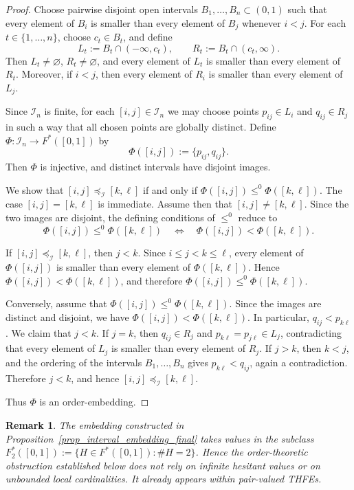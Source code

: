 \documentclass[11pt,a4paper]{article}
\newtheorem{remark}{Remark}
\begin{document}
\begin{proof}
Choose pairwise disjoint open intervals \(B_1,\dots,B_n\subset(0,1)\) such that every element of \(B_i\) is smaller than every element of \(B_j\) whenever \(i<j\). For each \(t\in\{1,\dots,n\}\), choose \(c_t\in B_t\), and define
\[
L_t:=B_t\cap(-\infty,c_t),
\qquad
R_t:=B_t\cap(c_t,\infty).
\]
Then \(L_t\neq\varnothing\), \(R_t\neq\varnothing\), and every element of \(L_t\) is smaller than every element of \(R_t\). Moreover, if \(i<j\), then every element of \(R_i\) is smaller than every element of \(L_j\).

Since \(\mathcal I_n\) is finite, for each \([i,j]\in\mathcal I_n\) we may choose points \(p_{ij}\in L_i\) and \(q_{ij}\in R_j\) in such a way that all chosen points are globally distinct. Define \(\Phi:\mathcal I_n\to F^*([0,1])\) by
\[
\Phi([i,j]):=\{p_{ij},q_{ij}\}.
\]
Then \(\Phi\) is injective, and distinct intervals have disjoint images.

We show that \([i,j]\preceq_{\mathcal I}[k,\ell]\) if and only if \(\Phi([i,j])\leq^0\Phi([k,\ell])\). The case \([i,j]=[k,\ell]\) is immediate. Assume then that \([i,j]\neq[k,\ell]\). Since the two images are disjoint, the defining conditions of \(\leq^0\) reduce to
\[
\Phi([i,j])\leq^0\Phi([k,\ell])
\quad\Longleftrightarrow\quad
\Phi([i,j])<\Phi([k,\ell]).
\]

If \([i,j]\preceq_{\mathcal I}[k,\ell]\), then \(j<k\). Since \(i\le j<k\le \ell\), every element of \(\Phi([i,j])\) is smaller than every element of \(\Phi([k,\ell])\). Hence \(\Phi([i,j])<\Phi([k,\ell])\), and therefore \(\Phi([i,j])\leq^0\Phi([k,\ell])\).

Conversely, assume that \(\Phi([i,j])\leq^0\Phi([k,\ell])\). Since the images are distinct and disjoint, we have \(\Phi([i,j])<\Phi([k,\ell])\). In particular, \(q_{ij}<p_{k\ell}\). We claim that \(j<k\). If \(j=k\), then \(q_{ij}\in R_j\) and \(p_{k\ell}=p_{j\ell}\in L_j\), contradicting that every element of \(L_j\) is smaller than every element of \(R_j\). If \(j>k\), then \(k<j\), and the ordering of the intervals \(B_1,\dots,B_n\) gives \(p_{k\ell}<q_{ij}\), again a contradiction. Therefore \(j<k\), and hence \([i,j]\preceq_{\mathcal I}[k,\ell]\).

Thus \(\Phi\) is an order-embedding.
\end{proof}

\begin{remark}\label{rem:two-point-obstruction}
The embedding constructed in Proposition~\ref{prop_interval_embedding_final} takes values in the subclass \(F^*_2([0,1]):=\{H\in F^*([0,1]) : \#H=2\}\). Hence the order-theoretic obstruction established below does not rely on infinite hesitant values or on unbounded local cardinalities. It already appears within pair-valued THFEs.
\end{remark}
\end{document}
